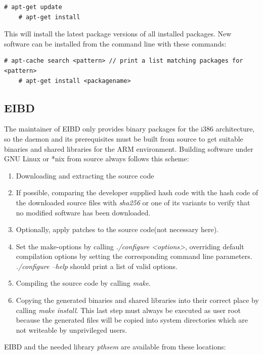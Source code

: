 \begin{lstlisting}[style=BashInputStyle]
    # apt-get update
    # apt-get install
\end{lstlisting}

This will install the latest package versions of all installed packages. New software can be installed from the command line with these commands:

\begin{lstlisting}[style=BashInputStyle]
    # apt-cache search <pattern> // print a list matching packages for <pattern> 
    # apt-get install <packagename>
\end{lstlisting}

\subsection{EIBD}

The maintainer of EIBD only provides binary packages for the i386 architecture, so the daemon and its prerequisites must be built from source to get
suitable binaries and shared libraries for the ARM environment. Building software under GNU Linux or *nix from source always follows this scheme:

\begin{enumerate}
 \item Downloading and extracting the source code
 \item If possible, comparing the developer supplied hash code  with the hash code of the downloaded source files with
 \textit{sha256} or one of its variants to verify that no modified software has been downloaded.
 \item Optionally, apply patches to the source code(not necessary here).
 \item Set the make-options by calling \textit{./configure <options>}, overriding default compilation options by setting the corresponding command line parameters.
 \textit{./configure --help} should print a list of valid options.
 \item Compiling the source code by calling \textit{make}.
 \item Copying the generated binaries and shared libraries into their correct place by calling \textit{make install}. This last step must always be executed
 as user root because the generated files will be copied into system directories which are not writeable by unprivileged users.
\end{enumerate}

EIBD and the needed library \textit{pthsem} are available from these locations:


